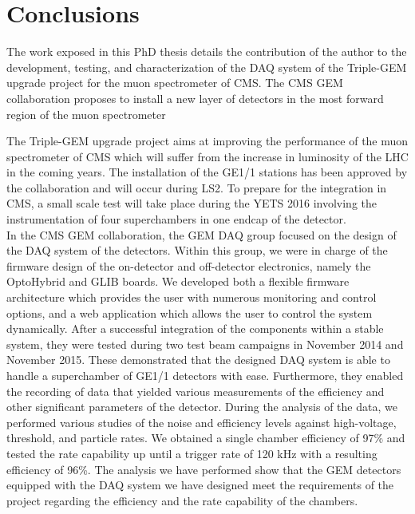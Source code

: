 \chapter*{Conclusions}
\label{chap:IV-0-conclusions}

  The work exposed in this PhD thesis details the contribution of the author to the development, testing, and characterization of the DAQ system of the Triple-GEM upgrade project for the muon spectrometer of CMS. The CMS GEM collaboration proposes to install a new layer of detectors in the most forward region of the muon spectrometer



  The Triple-GEM upgrade project aims at improving the performance of the muon spectrometer of CMS which will suffer from the increase in luminosity of the LHC in the coming years. The installation of the GE1/1 stations has been approved by the collaboration and will occur during LS2. To prepare for the integration in CMS, a small scale test will take place during the YETS 2016 involving the instrumentation of four superchambers in one endcap of the detector. \\

  In the CMS GEM collaboration, the GEM DAQ group focused on the design of the DAQ system of the detectors. Within this group, we were in charge of the firmware design of the on-detector and off-detector electronics, namely the OptoHybrid and GLIB boards. We developed both a flexible firmware architecture which provides the user with numerous monitoring and control options, and a web application which allows the user to control the system dynamically. After a successful integration of the components within a stable system, they were tested during two test beam campaigns in November 2014 and November 2015. These demonstrated that the designed DAQ system is able to handle a superchamber of GE1/1 detectors with ease. Furthermore, they enabled the recording of data that yielded various measurements of the efficiency and other significant parameters of the detector. During the analysis of the data, we performed various studies of the noise and efficiency levels against high-voltage, threshold, and particle rates. We obtained a single chamber efficiency of 97\% and tested the rate capability up until a trigger rate of 120 kHz with a resulting efficiency of 96\%. The analysis we have performed show that the GEM detectors equipped with the DAQ system we have designed meet the requirements of the project regarding the efficiency and the rate capability of the chambers. \\

